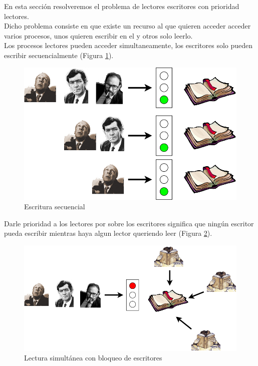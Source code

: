 En esta secci\'on resolveremos el problema de lectores escritores con prioridad
lectores.\\
Dicho problema consiste en que existe un recurso al que quieren acceder acceder varios procesos, 
unos quieren escribir en el y otros solo leerlo.\\
Los procesos lectores pueden acceder simultaneamente, los escritores solo pueden
escribir secuencialmente (Figura \ref{fig:escritores}).\\


\begin{figure}[!h]
	\centering
	\includegraphics[scale=0.4]{secciones/imagenes/escritores.png}
	\caption{Escritura secuencial}
	\label{fig:escritores}
\end{figure}


Darle prioridad a los lectores por sobre los escritores significa que ning\'un escritor pueda 
escribir mientras haya algun lector queriendo leer (Figura \ref{fig:lectores}).


\begin{figure}[!h]
	\centering
	\includegraphics[scale=0.5]{secciones/imagenes/lectores.png}
	\caption{Lectura simult\'anea con bloqueo de escritores}
	\label{fig:lectores}
\end{figure}


